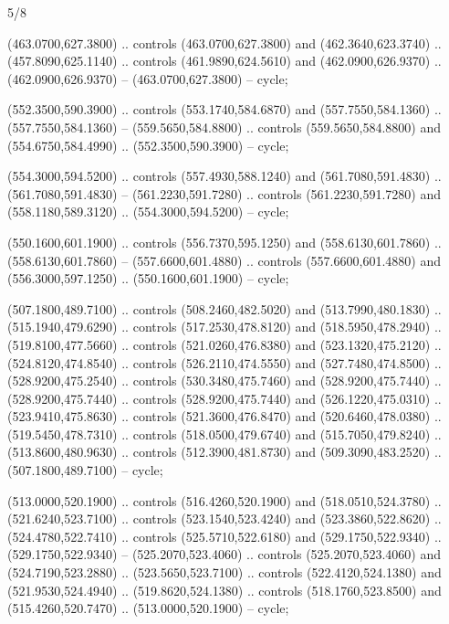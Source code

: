 \begin{flagdescription}{5/8}
\begin{scope}[shift={(m)}]
\begin{scope}[scale=\flagwidth/220,y=0.1mm, x=0.1mm, yscale=-1,shift={(-596,-360)}]
\begin{scope}[cm={{-1.0,0.0,0.0,1.0,(1193.9797,0.0)}}]
\begin{scope}[draw=black,line join=round,line cap=round,line width=0.381\lw]
\begin{scope}[fill=black]
 (463.0700,627.3800) .. controls (463.0700,627.3800) and
  (462.3640,623.3740) .. (457.8090,625.1140) .. controls (461.9890,624.5610) and
  (462.0900,626.9370) .. (462.0900,626.9370) -- (463.0700,627.3800) -- cycle;

 (552.3500,590.3900) .. controls (553.1740,584.6870) and
  (557.7550,584.1360) .. (557.7550,584.1360) -- (559.5650,584.8800) .. controls
  (559.5650,584.8800) and (554.6750,584.4990) .. (552.3500,590.3900) -- cycle;

 (554.3000,594.5200) .. controls (557.4930,588.1240) and
  (561.7080,591.4830) .. (561.7080,591.4830) -- (561.2230,591.7280) .. controls
  (561.2230,591.7280) and (558.1180,589.3120) .. (554.3000,594.5200) -- cycle;

 (550.1600,601.1900) .. controls (556.7370,595.1250) and
  (558.6130,601.7860) .. (558.6130,601.7860) -- (557.6600,601.4880) .. controls
  (557.6600,601.4880) and (556.3000,597.1250) .. (550.1600,601.1900) -- cycle;

 (507.1800,489.7100) .. controls (508.2460,482.5020) and
  (513.7990,480.1830) .. (515.1940,479.6290) .. controls (517.2530,478.8120) and
  (518.5950,478.2940) .. (519.8100,477.5660) .. controls (521.0260,476.8380) and
  (523.1320,475.2120) .. (524.8120,474.8540) .. controls (526.2110,474.5550) and
  (527.7480,474.8500) .. (528.9200,475.2540) .. controls (530.3480,475.7460) and
  (528.9200,475.7440) .. (528.9200,475.7440) .. controls (528.9200,475.7440) and
  (526.1220,475.0310) .. (523.9410,475.8630) .. controls (521.3600,476.8470) and
  (520.6460,478.0380) .. (519.5450,478.7310) .. controls (518.0500,479.6740) and
  (515.7050,479.8240) .. (513.8600,480.9630) .. controls (512.3900,481.8730) and
  (509.3090,483.2520) .. (507.1800,489.7100) -- cycle;

 (513.0000,520.1900) .. controls (516.4260,520.1900) and
  (518.0510,524.3780) .. (521.6240,523.7100) .. controls (523.1540,523.4240) and
  (523.3860,522.8620) .. (524.4780,522.7410) .. controls (525.5710,522.6180) and
  (529.1750,522.9340) .. (529.1750,522.9340) -- (525.2070,523.4060) .. controls
  (525.2070,523.4060) and (524.7190,523.2880) .. (523.5650,523.7100) .. controls
  (522.4120,524.1380) and (521.9530,524.4940) .. (519.8620,524.1380) .. controls
  (518.1760,523.8500) and (515.4260,520.7470) .. (513.0000,520.1900) -- cycle;
\end{scope}
\end{scope}
\end{scope}
\end{scope}
\end{scope}
\framecode{}
\end{flagdescription}
